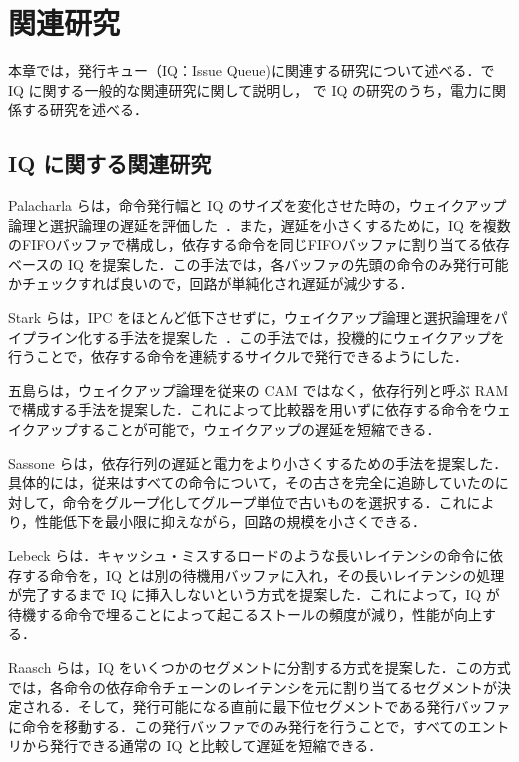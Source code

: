
\chapter{関連研究}
\label{sec:related_work}
本章では，発行キュー（IQ：Issue Queue)に関連する研究について述べる．で IQ に関する一般的な関連研究に関して説明し， で IQ の研究のうち，電力に関係する研究を述べる．

\section{IQ に関する関連研究}
\label{sec:relate_IQ}
Palacharla らは，命令発行幅と IQ のサイズを変化させた時の，ウェイクアップ論理と選択論理の遅延を評価した~\cite{Palacharla1997}．また，遅延を小さくするために，IQ を複数のFIFOバッファで構成し，依存する命令を同じFIFOバッファに割り当てる依存ベースの IQ を提案した．この手法では，各バッファの先頭の命令のみ発行可能かチェックすれば良いので，回路が単純化され遅延が減少する．

Stark らは，IPC をほとんど低下させずに，ウェイクアップ論理と選択論理をパイプライン化する手法を提案した~\cite{Stark2000}．この手法では，投機的にウェイクアップを行うことで，依存する命令を連続するサイクルで発行できるようにした．

五島らは，ウェイクアップ論理を従来の CAM ではなく，依存行列と呼ぶ RAM で構成する手法を提案した\cite{goshima2001}．これによって比較器を用いずに依存する命令をウェイクアップすることが可能で，ウェイクアップの遅延を短縮できる．

Sassone らは，依存行列の遅延と電力をより小さくするための手法を提案した\cite{sassone2007}．具体的には，従来はすべての命令について，その古さを完全に追跡していたのに対して，命令をグループ化してグループ単位で古いものを選択する．これにより，性能低下を最小限に抑えながら，回路の規模を小さくできる．

Lebeck らは．キャッシュ・ミスするロードのような長いレイテンシの命令に依存する命令を，IQ とは別の待機用バッファに入れ，その長いレイテンシの処理が完了するまで IQ に挿入しないという方式を提案した\cite{Lebeck2002}．これによって，IQ が待機する命令で埋ることによって起こるストールの頻度が減り，性能が向上する．

Raasch らは，IQ をいくつかのセグメントに分割する方式を提案した\cite{Raasch2002}．この方式では，各命令の依存命令チェーンのレイテンシを元に割り当てるセグメントが決定される．そして，発行可能になる直前に最下位セグメントである発行バッファに命令を移動する．この発行バッファでのみ発行を行うことで，すべてのエントリから発行できる通常の IQ と比較して遅延を短縮できる．

